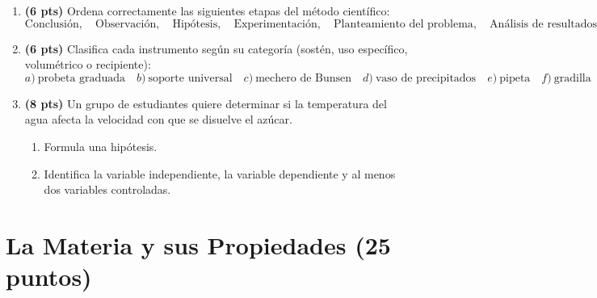 \documentclass[12pt, letterpaper]{article}
\begin{document}
\begin{enumerate}[leftmargin=*]
  \item \textbf{(6 pts)} Ordena correctamente las siguientes etapas del método científico:
        \[
          \text{Conclusión}, \quad \text{Observación}, \quad \text{Hipótesis}, \quad \text{Experimentación}, \quad \text{Planteamiento del problema}, \quad \text{Análisis de resultados}
        \]

  \item \textbf{(6 pts)} Clasifica cada instrumento según su categoría (sostén, uso específico, volumétrico o recipiente):
        \[
          a)\ \text{probeta graduada} \quad b)\ \text{soporte universal} \quad c)\ \text{mechero de Bunsen} \quad d)\ \text{vaso de precipitados} \quad e)\ \text{pipeta} \quad f)\ \text{gradilla}
        \]

  \item \textbf{(8 pts)} Un grupo de estudiantes quiere determinar si la temperatura del agua afecta la velocidad con que se disuelve el azúcar.
        \begin{enumerate}[label=\alph*)]
          \item Formula una hipótesis.
          \item Identifica la variable independiente, la variable dependiente y al menos dos variables controladas.
        \end{enumerate}
\end{enumerate}

\newpage

\section{La Materia y sus Propiedades (25 puntos)}
\end{document}
